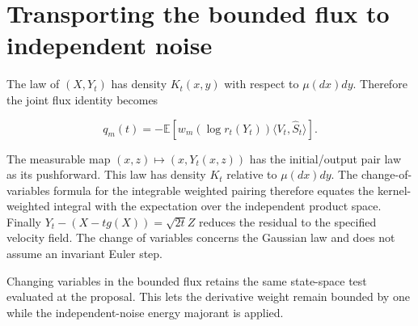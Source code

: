 \documentclass[11pt,a4paper]{article}
\begin{document}
\section{\texorpdfstring{Transporting the bounded flux to independent noise}{Transporting the bounded flux to independent noise}}


The law of \((X,Y_t)\) has density \(K_t(x,y)\) with respect to \(\mu(dx)dy\). Therefore the joint flux identity becomes

\[q_m(t)=-\mathbb E\!\left[w_m(\log r_t(Y_t))\langle V_t,\widehat S_t\rangle\right].\]

The measurable map \((x,z)\mapsto(x,Y_t(x,z))\) has the initial/\allowbreak{}output pair law as its pushforward. This law has density \(K_t\) relative to \(\mu(dx)dy\). The change-of-variables formula for the integrable weighted pairing therefore equates the kernel-weighted integral with the expectation over the independent product space. Finally \(Y_t-(X-tg(X))=\sqrt{2t}Z\) reduces the residual to the specified velocity field. The change of variables concerns the Gaussian law and does not assume an invariant Euler step.



Changing variables in the bounded flux retains the same state-space test evaluated at the proposal. This lets the derivative weight remain bounded by one while the independent-noise energy majorant is applied.
\end{document}
